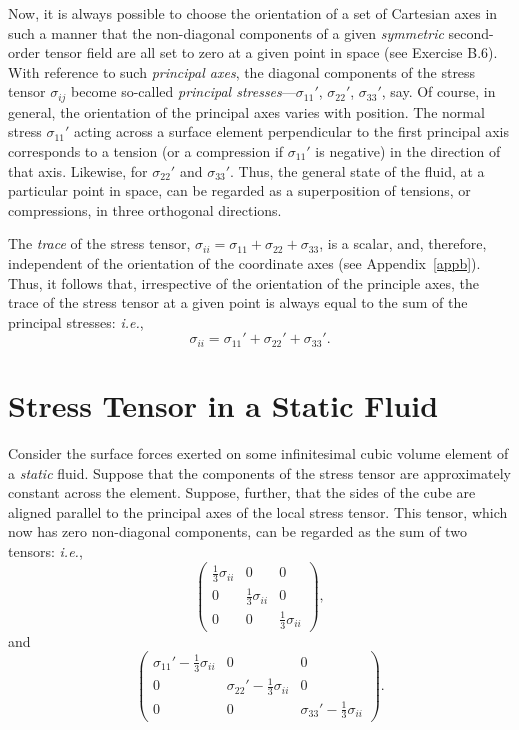 Now, it is always possible to choose the orientation of a set of Cartesian axes in such a manner
 that the non-diagonal components of a given {\em symmetric}\/ second-order tensor field  are all set to zero at a given point in space
 (see Exercise B.6). 
 With reference to such {\em principal axes}, the
 diagonal components of the stress tensor $\sigma_{ij}$  become so-called {\em principal stresses}---$\sigma_{11}'$, $\sigma_{22}'$, $\sigma_{33}'$, say. Of course, in general, the orientation of the principal axes varies with position. 
 The normal stress $\sigma_{11}'$ acting across a surface
 element perpendicular to the first principal axis  corresponds to a tension (or a compression if $\sigma_{11}'$ is negative)
 in the direction of that axis. Likewise, for $\sigma_{22}'$ and $\sigma_{33}'$. Thus, the general state of the
 fluid, at a particular point in space, can be regarded as a superposition of tensions, or compressions, in three orthogonal directions.
 
 The {\em trace}\/ of the stress tensor, $\sigma_{ii}=\sigma_{11}
 +\sigma_{22}+\sigma_{33}$, is a scalar, and, therefore, independent of the orientation of the coordinate axes (see Appendix~\ref{appb}). Thus,
 it follows that, irrespective of the orientation of the principle axes, the trace of the stress tensor at a given point  is always equal to the sum of the principal stresses: {\em i.e.},
 \begin{equation}\label{e4.11}
 \sigma_{ii} = \sigma_{11}'+\sigma_{22}'+\sigma_{33}'.
 \end{equation}
 
\section{Stress Tensor in a Static Fluid}\label{s5.5}
Consider the surface forces exerted on some infinitesimal cubic volume element of a {\em static}\/ fluid. Suppose that the 
components of the stress tensor are approximately constant across the element. Suppose, further, that the sides of
the cube are aligned parallel to the principal axes of the local stress tensor. This tensor, which now has zero
non-diagonal components, can be regarded as the sum of two tensors: {\em i.e.},
\begin{equation}
\left(
\begin{array}{ccc}
\frac{1}{3}\sigma_{ii}& 0 & 0\\[0.5ex]
0&\frac{1}{3}\sigma_{ii} & 0 \\[0.5ex]
0&0&\frac{1}{3}\sigma_{ii}
\end{array}\right),\label{e4.12}
\end{equation}
and
\begin{equation}
\left(
\begin{array}{ccc}
\sigma_{11}'-\frac{1}{3}\sigma_{ii}& 0 & 0\\[0.5ex]
0&\sigma_{22}'-\frac{1}{3}\sigma_{ii} & 0 \\[0.5ex]
0&0&\sigma_{33}'-\frac{1}{3}\sigma_{ii}
\end{array}\right).\label{e4.13}
\end{equation}

